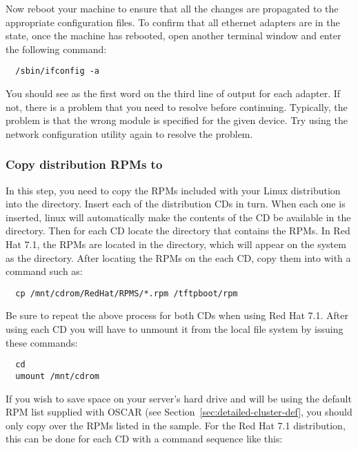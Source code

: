 Now reboot your machine to ensure that all the changes are propagated
to the appropriate configuration files. To confirm that all ethernet
adapters are in the  state, once the machine has rebooted,
open another terminal window and enter the following command:

\begin{verbatim}
  /sbin/ifconfig -a
\end{verbatim}
  
You should see  as the first word on the third line of output
for each adapter. If not, there is a problem that you need to resolve
before continuing. Typically, the problem is that the wrong module is
specified for the given device. Try using the network configuration
utility again to resolve the problem.
  
\subsubsection{Copy distribution RPMs to }

In this step, you need to copy the RPMs included with your Linux
distribution into the  directory. 
\begchange
Insert each of the distribution CDs in turn.
When each one is inserted, linux will automatically make the
contents of the CD be available in the  directory.
Then for each CD locate the directory that contains the RPMs.
In Red Hat 7.1, the RPMs are located in the 
directory, which will appear on the system as the 
 directory. 
\endchange
 After locating the RPMs on the each CD, copy them into
 with a command such as:

\begin{verbatim}
  cp /mnt/cdrom/RedHat/RPMS/*.rpm /tftpboot/rpm
\end{verbatim}
  
Be sure to repeat the above process for both CDs when using Red Hat
7.1.
\begchange
After using each CD you will have to unmount it from the local
file system by issuing these commands:

\begin{verbatim}
  cd
  umount /mnt/cdrom
\end{verbatim}
\endchange
If you wish to save space on your server's hard drive and will be
using the default RPM list supplied with OSCAR (see
Section~\ref{sec:detailed-cluster-def},
you should only copy over the RPMs listed in the sample.
\begchange
For the Red Hat 7.1 distribution, this can be done for each CD with
a command sequence like this:

